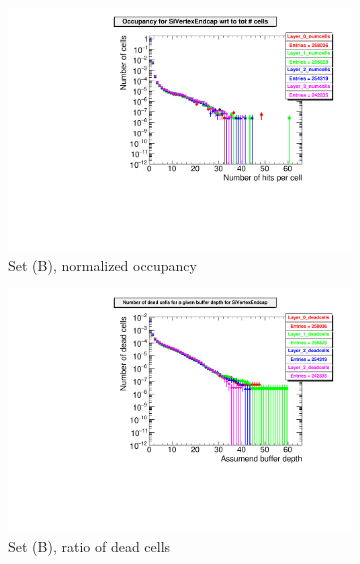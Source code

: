   \begin{figure}[htb]\ContinuedFloat
     \begin{subfigure}[b]{0.49\textwidth}
   \centering
    \includegraphics[width=\textwidth]{Figures/Pairs/Appendix/occupancy_numcells_SiVertexEndcap_ILC250_SetB.pdf}
   \caption{Set (B), normalized occupancy}
   \end{subfigure}
   \hfill
    \begin{subfigure}[b]{0.49\textwidth}
   \centering
    \includegraphics[width=\textwidth]{Figures/Pairs/Appendix/occupancy_deadcells_SiVertexEndcap_ILC250_SetB.pdf}
   \caption{Set (B), ratio of dead cells}
   \end{subfigure}\\
     \begin{subfigure}[b]{0.49\textwidth}
   \centering

\end{subfigure}
\end{figure}
